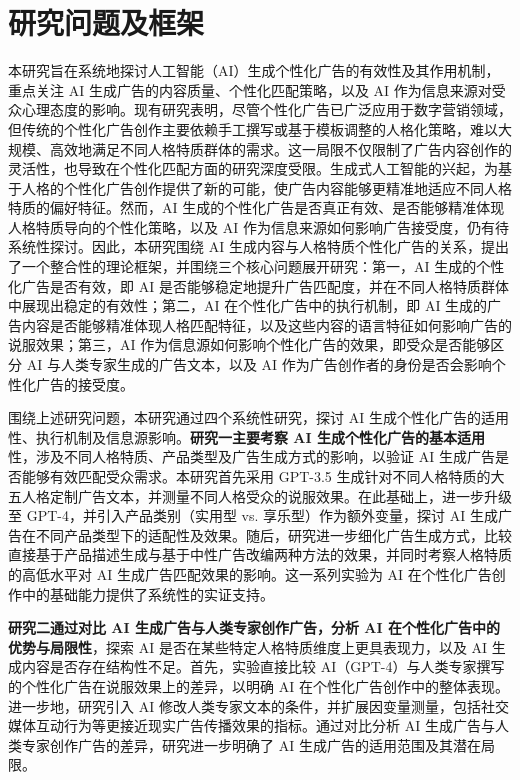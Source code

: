 \section{研究问题及框架}
本研究旨在系统地探讨人工智能（AI）生成个性化广告的有效性及其作用机制，重点关注 AI 生成广告的内容质量、个性化匹配策略，以及 AI 作为信息来源对受众心理态度的影响。现有研究表明，尽管个性化广告已广泛应用于数字营销领域，但传统的个性化广告创作主要依赖手工撰写或基于模板调整的人格化策略，难以大规模、高效地满足不同人格特质群体的需求。这一局限不仅限制了广告内容创作的灵活性，也导致在个性化匹配方面的研究深度受限。生成式人工智能的兴起，为基于人格的个性化广告创作提供了新的可能，使广告内容能够更精准地适应不同人格特质的偏好特征。然而，AI 生成的个性化广告是否真正有效、是否能够精准体现人格特质导向的个性化策略，以及 AI 作为信息来源如何影响广告接受度，仍有待系统性探讨。因此，本研究围绕 AI 生成内容与人格特质个性化广告的关系，提出了一个整合性的理论框架，并围绕三个核心问题展开研究：第一，AI 生成的个性化广告是否有效，即 AI 是否能够稳定地提升广告匹配度，并在不同人格特质群体中展现出稳定的有效性；第二，AI 在个性化广告中的执行机制，即 AI 生成的广告内容是否能够精准体现人格匹配特征，以及这些内容的语言特征如何影响广告的说服效果；第三，AI 作为信息源如何影响个性化广告的效果，即受众是否能够区分 AI 与人类专家生成的广告文本，以及 AI 作为广告创作者的身份是否会影响个性化广告的接受度。

围绕上述研究问题，本研究通过四个系统性研究，探讨 AI 生成个性化广告的适用性、执行机制及信息源影响。\textbf{研究一主要考察 AI 生成个性化广告的基本适用}性，涉及不同人格特质、产品类型及广告生成方式的影响，以验证 AI 生成广告是否能够有效匹配受众需求。本研究首先采用 GPT-3.5 生成针对不同人格特质的大五人格定制广告文本，并测量不同人格受众的说服效果。在此基础上，进一步升级至 GPT-4，并引入产品类别（实用型 vs. 享乐型）作为额外变量，探讨 AI 生成广告在不同产品类型下的适配性及效果。随后，研究进一步细化广告生成方式，比较直接基于产品描述生成与基于中性广告改编两种方法的效果，并同时考察人格特质的高低水平对 AI 生成广告匹配效果的影响。这一系列实验为 AI 在个性化广告创作中的基础能力提供了系统性的实证支持。

\textbf{研究二通过对比 AI 生成广告与人类专家创作广告，分析 AI 在个性化广告中的优势与局限性}，探索 AI 是否在某些特定人格特质维度上更具表现力，以及 AI 生成内容是否存在结构性不足。首先，实验直接比较 AI（GPT-4）与人类专家撰写的个性化广告在说服效果上的差异，以明确 AI 在个性化广告创作中的整体表现。进一步地，研究引入 AI 修改人类专家文本的条件，并扩展因变量测量，包括社交媒体互动行为等更接近现实广告传播效果的指标。通过对比分析 AI 生成广告与人类专家创作广告的差异，研究进一步明确了 AI 生成广告的适用范围及其潜在局限。

